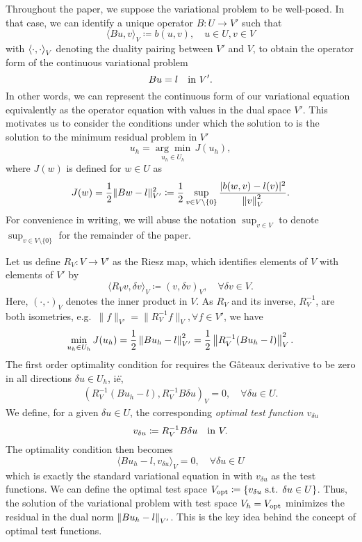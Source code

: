 Throughout the paper, we suppose the variational
problem  to be well-posed. In that case, we can
identify a unique operator $B:U\rightarrow V'$ such that
\[
\langle Bu,v\rangle_V \coloneqq b(u,v), \quad u\in U, v\in V
\]
with $\LRa{\cdot, \cdot}_V$ denoting the duality pairing between $V'$ and $V$, to obtain the operator form of the continuous variational problem
\begin{equation}
\eqnlab{dualEq}
Bu = l \quad \text{in } V'.
\end{equation}
In other words, we can represent the continuous form of our variational equation
 equivalently as the operator equation  with values in the
dual space $V'$.  This motivates us to consider the conditions under which the solution to  is the solution to the minimum residual problem in $V'$ 
\[
u_h = \underset{u_h\in U_h}{\arg\min}\, J(u_h),
\]
where $J(w)$ is defined for $w\in U$ as 
\[
J(w) = \frac{1}{2}\|Bw-l\|_{V'}^2 \coloneqq\frac{1}{2} \sup_{v\in V\setminus\{0\}} \frac{| b(w,v)-l(v)|^2}{\nor{v}_V^2}.
\]
For convenience in writing, we will abuse the notation $\sup_{v \in V}$ to denote $\sup_{v\in V\setminus\{0\}}$ for the remainder of the paper.

Let us define $R_V: V \to V'$ as the Riesz map, which identifies
elements of $V$ with elements of $V'$ by 
\[
\langle R_V v,\delta
v\rangle_V \coloneqq(v, \delta v)_V, \quad \forall \delta v \in V.
\]
Here, $(\cdot, \cdot)_V$ denotes the
inner product in $V$. As $R_V$ and its inverse, $R_V^{-1}$, are both
isometries, e.g.\ $\|f\|_{V'} = \|R_V^{-1} f\|_V, \forall f \in V'$, we
have
\begin{equation}
\eqnlab{minimization}
\min_{u_h\in U_h} J(u_h) = \frac{1}{2}\left\|Bu_h-l\right\|_{V'}^2 =  \frac{1}{2}\left\|R_V^{-1}(Bu_h-l)\right\|_V^2.
\end{equation}
The first order optimality condition for  requires
the G\^ateaux derivative to be zero in all directions $\delta u \in
U_h$, i\.e\.,
\begin{align*}
\left(R_V^{-1}(Bu_h-l),R_V^{-1}B\delta u\right)_V = 0, \quad \forall \delta u \in U. 
\end{align*}
We define, for a given $\delta u \in U$, the corresponding {\em optimal test function} $v_{\delta u}$
\begin{equation}
\eqnlab{optv}
v_{\delta u} \coloneqq R_V^{-1}B\delta u \quad  \text{in } V.
\end{equation} 
The optimality condition then becomes
\[
 \langle Bu_h-l, v_{\delta u}\rangle_V = 0, \quad \forall \delta u \in U
\]
which is exactly the standard variational equation in
  with $v_{\delta u}$ as the test functions. We can define the optimal test space $V_{\rm opt} \coloneqq \{v_{\delta u} \text{ s.t. } \delta u\in U\}$. Thus, the solution of the variational problem  with test space $V_h = V_{\rm opt}$ minimizes the residual in the dual norm $\nor{Bu_h-l}_{V'}$. This is the key idea behind the concept of optimal test functions. 


